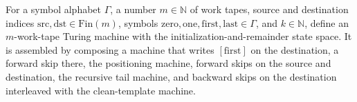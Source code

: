 \begin{definition}
\label{Turing.rt_initRestTM}
\leanok
{}
For a symbol alphabet $\Gamma$, a number $m\in\mathbb N$ of work tapes, source and
destination indices $\mathrm{src},\mathrm{dst}\in\mathrm{Fin}(m)$, symbols
$\mathrm{zero},\mathrm{one},\mathrm{first},\mathrm{last}\in\Gamma$, and $k\in\mathbb N$,
define an $m$-work-tape Turing machine with the initialization-and-remainder state
space. It is assembled by composing a machine that writes $[\mathrm{first}]$ on the
destination, a forward skip there, the positioning machine, forward skips on the source
and destination, the recursive tail machine, and backward skips on the destination
interleaved with the clean-template machine.
\end{definition}

